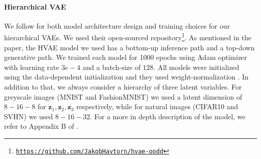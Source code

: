 {\paragraph{Hierarchical VAE} We follow \cite{havtorn_hierarchical_2021} for both model architecture design and training choices for our hierarchical VAEs. We used their open-sourced repository\footnote{\href{https://github.com/JakobHavtorn/hvae-oodd}{\texttt{https://github.com/JakobHavtorn/hvae-oodd}}}. As mentioned in the paper, the HVAE model we used has a bottom-up inference path and a top-down generative path. We trained each model for 1000 epochs using Adam optimizer with learning rate $3e-4$ and a batch-size of $128$. All models were initialized using the data-dependent initialization and they used weight-normalization \citep{salimans_weight_2016}. In addition to that, we always consider a hierarchy of three latent variables. For greyscale images (MNIST and FashionMNIST) we used a latent dimension of $8-16-8$ for $\mathbf{z}_1, \mathbf{z}_2, \mathbf{z}_3$ respectively, while for natural images (CIFAR10 and SVHN) we used $8-16-32$. For a more in depth description of the model, we refer to Appendix B of \textcite{havtorn_hierarchical_2021}.


\begin{table}[tb]
    \caption{Test log-likelihood (bits/dim) on MNIST, FashionMNIST, SVHN, and CIFAR10 achieved by the models used in the paper.}
    \label{tab_modelagnostic:log_like}
    \begin{subtable}{0.48\textwidth}
        \centering
        \scriptsize
\end{subtable}
\end{table}}
